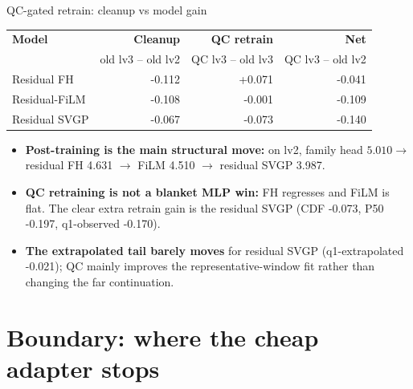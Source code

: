 \documentclass[UTF8,aspectratio=169]{ctexbeamer}
\newcommand{\good}[1]{\textcolor{green!45!black}{#1}}
\newcommand{\warn}[1]{\textcolor{red!65!black}{#1}}
\begin{document}
\begin{frame}{QC-gated retrain: cleanup vs model gain}
\small
\begin{center}
\scriptsize
\renewcommand{\arraystretch}{1.12}
\setlength{\tabcolsep}{4pt}
\begin{tabular}{@{}lrrr@{}}
\toprule
\textbf{Model} & \textbf{Cleanup} & \textbf{QC retrain} & \textbf{Net} \\
 & \scriptsize old lv3 -- old lv2 & \scriptsize QC lv3 -- old lv3 & \scriptsize QC lv3 -- old lv2 \\
\midrule
Residual FH    & \good{-0.112} & \warn{+0.071} & -0.041 \\
Residual-FiLM  & \good{-0.108} & -0.001 & -0.109 \\
\rowcolor{winrow}
Residual SVGP  & \good{-0.067} & \good{-0.073} & \good{-0.140} \\
\bottomrule
\end{tabular}
\end{center}
\vspace{0.25em}
\footnotesize
\begin{itemize}\setlength\itemsep{2pt}
  \item \textbf{Post-training is the main structural move:} on lv2, family head
        $5.010\to$ residual FH 4.631 $\to$ FiLM 4.510 $\to$ residual SVGP 3.987.
  \item \textbf{QC retraining is not a blanket MLP win:} FH regresses and FiLM is flat.
        The clear extra retrain gain is the residual SVGP (CDF \good{-0.073},
        P50 \good{-0.197}, q1-observed \good{-0.170}).
  \item \textbf{The extrapolated tail barely moves} for residual SVGP
        (q1-extrapolated \good{-0.021}); QC mainly improves the representative-window
        fit rather than changing the far continuation.
\end{itemize}
\end{frame}

\section{Boundary: where the cheap adapter stops}
\end{document}
